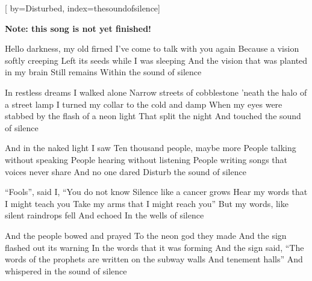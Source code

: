 

[%
    by={Disturbed},
    index={thesoundofsilence}]


    \label{thesoundofsilence}

    \textbf{Note: this song is not yet finished!}

    \beginverse
        Hello darkness, my old firned
        I've come to talk with you again
        Because a vision softly creeping
        Left its seeds while I was sleeping
        And the vision that was planted in my brain
        Still remains
        Within the sound of silence
    \endverse

    \beginverse
        In restless dreams I walked alone
        Narrow streets of cobblestone
        'neath the halo of a street lamp
        I turned my collar to the cold and damp
        When my eyes were stabbed by the flash of a neon light
        That split the night
        And touched the sound of silence
    \endverse

    \beginverse
        And in the naked light I saw
        Ten thousand people, maybe more
        People talking without speaking
        People hearing without listening
        People writing songs that voices never share
        And no one dared
        Disturb the sound of silence
    \endverse

    \beginverse
        ``Fools'', said I, ``You do not know
        Silence like a cancer grows
        Hear my words that I might teach you
        Take my arms that I might reach you''
        But my words, like silent raindrops fell
        And echoed
        In the wells of silence
    \endverse

    \beginverse
        And the people bowed and prayed
        To the neon god they made
        And the sign flashed out its warning
        In the words that it was forming
        And the sign said, ``The words of the prophets are written on the subway walls
        And tenement halls''
        And whispered in the sound of silence
    \endverse
\endsong
